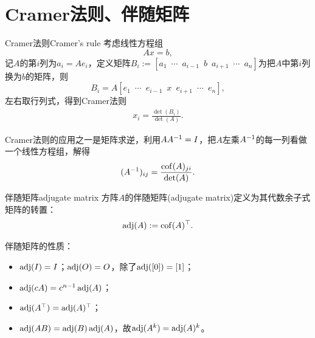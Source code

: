 \section{Cramer法则、伴随矩阵}
\begin{theorem}{Cramer法则}{Cramer's rule}
	考虑线性方程组
	\[
		Ax=b,
	\]
	记$A$的第$i$列为$a_i=Ae_i$，定义矩阵$B_i:=[a_1\enspace\cdots\enspace a_{i-1}\enspace b\enspace a_{i+1}\enspace\cdots\enspace a_n]$为把$A$中第$i$列换为$b$的矩阵，则
	\[
		B_i=A[e_1\enspace\cdots\enspace e_{i-1}\enspace x\enspace e_{i+1}\enspace\cdots\enspace e_n],
	\]
	左右取行列式，得到Cramer法则
	\begin{align}
		x_i=\frac{\det(B_i)}{\det(A)}.
	\end{align}
\end{theorem}
\begin{corollary}
	Cramer法则的应用之一是矩阵求逆，利用$AA^{-1}=I$，把$A$左乘$A^{-1}$的每一列看做一个线性方程组，解得
	\[
		(A^{-1})_{ij}=\frac{\operatorname{cof}(A)_{ji}}{\det(A)}.
	\]
\end{corollary}
\begin{definition}{伴随矩阵}{adjugate matrix}
	方阵$A$的伴随矩阵(adjugate matrix)定义为其代数余子式矩阵的转置：
	\begin{align}
		\operatorname{adj}(A):=\operatorname{cof}(A)^\top.
	\end{align}
\end{definition}

\begin{corollary}
	伴随矩阵的性质：
	\begin{itemize}
		\item $\operatorname{adj}(I)=I$；$\operatorname{adj}(O)=O$，除了$\operatorname{adj}([0])=[1]$；
		\item $\operatorname{adj}(cA)=c^{n-1}\operatorname{adj}(A)$；
		\item $\operatorname{adj}(A^\top)=\operatorname{adj}(A)^\top$；
		\item $\operatorname{adj}(AB)=\operatorname{adj}(B)\operatorname{adj}(A)$，故$\operatorname{adj}(A^k)=\operatorname{adj}(A)^k$。
	\end{itemize}
\end{corollary}

